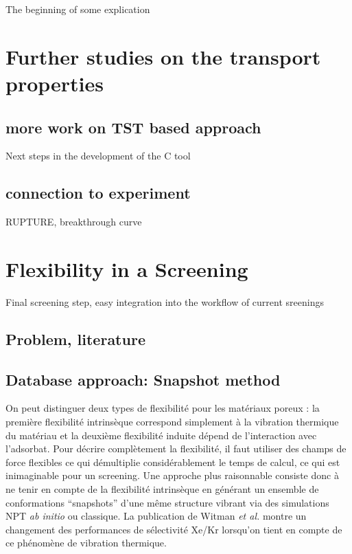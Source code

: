 \documentclass[main]{subfiles}
\begin{document}

The beginning of some explication


\section{Further studies on the transport properties}

\subsection{more work on TST based approach}
Next steps in the development of the C tool

\subsection{connection to experiment}
RUPTURE, breakthrough curve

\section{Flexibility in a Screening}
Final screening step, easy integration into the workflow of current sreenings
\subsection{Problem, literature}

\subsection{}


\subsection{Database approach: Snapshot method}

On peut distinguer deux types de flexibilité pour les matériaux poreux : la première flexibilité intrinsèque correspond simplement à la vibration thermique du matériau et la deuxième flexibilité induite dépend de l'interaction avec l'adsorbat. Pour décrire complètement la flexibilité, il faut utiliser des champs de force flexibles ce qui démultiplie considérablement le temps de calcul, ce qui est inimaginable pour un screening. Une approche plus raisonnable consiste donc à ne tenir en compte de la flexibilité intrinsèque en générant un ensemble de conformations ``snapshots'' d'une même structure vibrant via des simulations NPT \emph{ab initio} ou classique. La publication de Witman \emph{et al.} montre un changement des performances de sélectivité Xe/Kr lorsqu'on tient en compte de ce phénomène de vibration thermique.\autocite{Witman_2017} 
\end{document}

